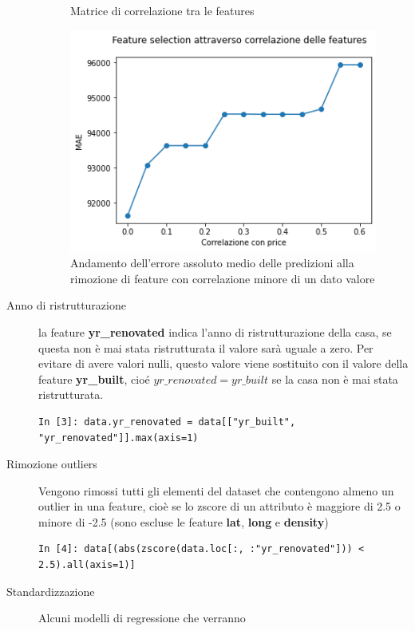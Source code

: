 \documentclass{article}
\begin{document}
\begin{description}
\begin{figure}[ht]
\begin{minipage}{0.48\textwidth}
				\caption{Matrice di correlazione tra le features}
			\end{minipage}
			\hfill
			\begin{minipage}{0.48\textwidth}
				\centering
				\includegraphics[width=\textwidth]{selection.png}
				\caption{Andamento dell'errore assoluto medio delle predizioni
				alla rimozione di feature con correlazione minore di un dato
				valore}
			\end{minipage}
			\label{fig:selection}
		\end{figure}
	\item[Anno di ristrutturazione] la feature \textbf{yr\_renovated} indica
		l'anno di ristrutturazione della casa, se questa non è mai stata
		ristrutturata il valore sarà uguale a zero. Per evitare di avere valori
		nulli, questo valore viene sostituito con il valore della feature
		\textbf{yr\_built}, cioé $yr\_renovated = yr\_built$ se la casa non è
		mai stata ristrutturata.
		\begin{verbatim}
In [3]: data.yr_renovated = data[["yr_built", "yr_renovated"]].max(axis=1)
		\end{verbatim}
	\item[Rimozione outliers] Vengono rimossi tutti gli elementi del dataset
		che contengono almeno un outlier in una feature, cioè se lo zscore di
		un attributo è maggiore di 2.5 o minore di -2.5 (sono escluse le
		feature \textbf{lat}, \textbf{long} e \textbf{density})
		\begin{verbatim}
In [4]: data[(abs(zscore(data.loc[:, :"yr_renovated"])) < 2.5).all(axis=1)]
		\end{verbatim}
	\item[Standardizzazione] Alcuni modelli di regressione che verranno

\end{description}
\end{document}
